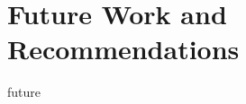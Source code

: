 \documentclass[a4paper,12pt,oneside]{book}
\begin{document}
\chapter{Future Work and Recommendations}
{future}

\printbibliography[
    heading=bibintoc,
    title={Bibliography}]

\begin{appendices}
    \makeatletter
\end{appendices}
\end{document}
